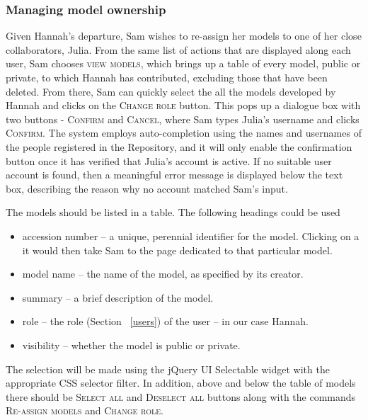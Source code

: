 \subsubsection{Managing model ownership}
Given Hannah's departure, Sam wishes to re-assign her models to one of her close collaborators, Julia. From the same list of actions that are displayed along each user, Sam chooses \textsc{view models}, which brings up a table of every model, public or private, to which Hannah has contributed, excluding those that have been deleted. From there, Sam can quickly select the all the models developed by Hannah and clicks on the \textsc{Change role} button. This pops up a dialogue box with two buttons - \textsc{Confirm} and \textsc{Cancel}, where Sam types Julia's username and clicks \textsc{Confirm}. The system employs auto-completion using the names and usernames of the people registered in the Repository, and it will only enable the confirmation button once it has verified that Julia's account is active. If no suitable user account is found, then a meaningful error message is displayed below the text box, describing the reason why no account matched Sam's input. 

\begin{techNote}
The models should be listed in a table. The following headings could be used
\begin{itemize}
\item accession number -- a unique, perennial identifier for the model. Clicking on a it would then take Sam to the page dedicated to that particular model. 
\item model name -- the name of the model, as specified by its creator.
\item summary -- a brief description of the model.
\item role -- the role (Section ~\ref{users}) of the user -- in our case Hannah. 
\item visibility -- whether the model is public or private. 
\end{itemize}
The selection will be made  using the jQuery UI Selectable widget with the appropriate CSS selector filter. In addition, above and below the table of models there should be \textsc{Select all} and \textsc{Deselect all} buttons along with the commands \textsc{Re-assign models} and \textsc{Change role}.
\end{techNote}


